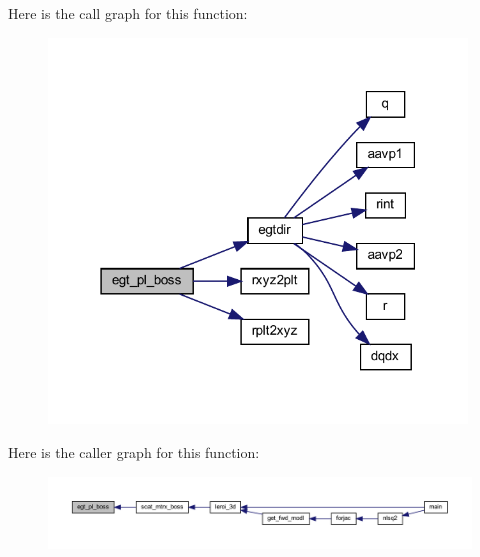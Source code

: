 Here is the call graph for this function\+:\nopagebreak
\begin{figure}[H]
\begin{center}
\leavevmode
\includegraphics[width=315pt]{Leroi_8f90_a7acbe12b71ec5be34d994fc6743480c8_cgraph}
\end{center}
\end{figure}
Here is the caller graph for this function\+:\nopagebreak
\begin{figure}[H]
\begin{center}
\leavevmode
\includegraphics[width=350pt]{Leroi_8f90_a7acbe12b71ec5be34d994fc6743480c8_icgraph}
\end{center}
\end{figure}
\mbox{\label{Leroi_8f90_a9074cfabdfb82294ca3b8541c14a9099}} 
